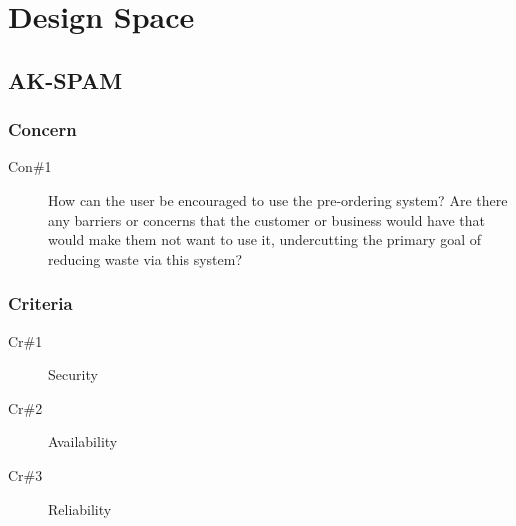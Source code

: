 \documentclass[11pt]{article}
\begin{document}
\newpage
\section{Design Space}
\label{sec:orge066981}
\subsection*{AK-SPAM}
\label{sec:org440fcbe}
\subsubsection*{Concern}
\label{sec:orgc6deb3d}
\begin{description}
\item[{Con\#1}] How can the user be encouraged to use the pre-ordering
system? Are there any barriers or concerns that the
customer or business would have that would make them
not want to use it, undercutting the primary goal of
reducing waste via this system?
\end{description}
\subsubsection*{Criteria}
\label{sec:org0a5e5bd}
\begin{description}
\item[{Cr\#1}] Security
\item[{Cr\#2}] Availability
\item[{Cr\#3}] Reliability
\end{description}
\end{document}
